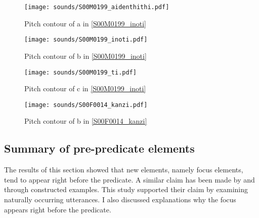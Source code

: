 \begin{figure}
	\begin{center}
	\texttt{[image: sounds/S00M0199\_aidenthithi.pdf]}
	\caption{Pitch contour of a in \ref{S00M0199_inoti}}
	\label{S00M0199_aidenthithiF}
	\end{center}
\end{figure}
\begin{figure}
	\begin{center}
	\texttt{[image: sounds/S00M0199\_inoti.pdf]}
	\caption{Pitch contour of b in \ref{S00M0199_inoti}}
	\label{S00M0199_inotiF}
	\end{center}
\end{figure}
\begin{figure}
	\begin{center}
	\texttt{[image: sounds/S00M0199\_ti.pdf]}
	\caption{Pitch contour of c in \ref{S00M0199_inoti}}
	\label{S00M0199_tiF}
	\end{center}
\end{figure}
\begin{figure}
	\begin{center}
	\texttt{[image: sounds/S00F0014\_kanzi.pdf]}
	\caption{Pitch contour of b in \ref{S00F0014_kanzi}}
	\label{S00F0014_kanziF}
	\end{center}
\end{figure}

\subsection{Summary of pre-predicate elements}

The results of this section showed that
new elements, namely focus elements, tend to appear right before the predicate.
A similar claim has been made by  and 
through constructed examples.
This study supported their claim by examining naturally occurring utterances.
I also discussed explanations why the focus appears right before the predicate.


